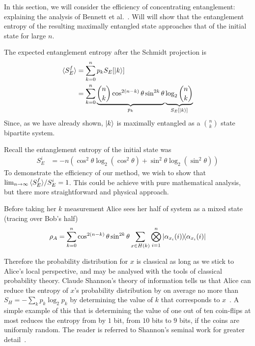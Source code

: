 In this section, we will consider the efficiency of concentrating entanglement: explaining the analysis of Bennett et al.~\cite{bennett1996concentrating}.
Will will show that the entanglement entropy of the resulting maximally entangled state approaches that of the initial state for large $n$.

The expected entanglement entropy after the Schmidt projection is
\begin{align*}
{\langle S_E^f \rangle} &= \sum_{k=0}^n p_k S_E[\ket{k}] \\
&=\sum_{k=0}^n \underbrace{\binom{n}{k} \cos^{2(n-k)}\theta \sin^{2k}\theta}_{p_k}
 \underbrace{\log_2 \binom{n}{k}}_{S_E[\ket{k}]}
\end{align*}
Since, as we have already shown, $\ket{k}$ is maximally entangled as a $\binom{n}{k}$ state bipartite system.

Recall the entanglement entropy of the initial state was
\begin{align*}
S_{E}^i &= -n \left( \cos^2\theta \log_2 \left(\cos^2\theta \right)
+ \sin^2\theta \log_2 \left(\sin^2\theta \right)\right)
\end{align*}
To demonstrate the efficiency of our method, we wish to show that \\$\lim_{n \rightarrow \infty}  {\langle S_E^f \rangle} / S_E^i  = 1$.
This could be achieve with pure mathematical analysis, but there more straightforward and physical approach.

Before taking her $k$ measurement Alice sees her half of system as a mixed state (tracing over Bob's half)
\begin{align*}
\rho_A = \sum_{k=0}^n \cos^{2(n-k)}\theta \sin^{2k}\theta
\sum_{x \in H(k)} \bigotimes_{i=1}^n 
\dyad{\alpha_{x_i}(i)}{\alpha_{x_i}(i)}
\end{align*}

Therefore the probability distribution for $x$ is classical as long as we stick to Alice's local perspective, and may be analysed with the tools of classical probability theory.
Claude Shannon's theory of information tells us that Alice can reduce the entropy of $x$'s probability distribution  by on average no more than $S_H = - \sum_k p_k \log_2 p_k$ by determining the value of $k$ that corresponds to $x$~\cite{shannon2001communication}. A simple example of this that is determining the value of one out of ten coin-flips at most reduces the entropy from by $1$ bit, from $10$ bits to $9$ bits, if the coins are uniformly random. The reader is referred to Shannon's seminal work for greater detail~\cite{shannon2001communication}.

